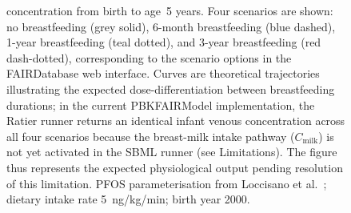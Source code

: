 \documentclass[preprint,12pt]{elsarticle}
\begin{document}
\begin{linenumbers}
\begin{figure}[htbp]
{concentration from birth to age~5 years. Four scenarios are shown: no breastfeeding
(grey solid), 6-month breastfeeding (blue dashed), 1-year breastfeeding
(teal dotted), and 3-year breastfeeding (red dash-dotted), corresponding to
the scenario options in the FAIRDatabase web interface.
Curves are theoretical trajectories illustrating the expected dose-differentiation
between breastfeeding durations; in the current PBKFAIRModel implementation,
the Ratier runner returns an identical infant venous concentration across all four
scenarios because the breast-milk intake pathway ($C_\mathrm{milk}$) is not yet
activated in the SBML runner (see Limitations). The figure thus represents the
expected physiological output pending resolution of this limitation. PFOS
parameterisation from Loccisano et al.\ \cite{loccisano2013}; dietary intake
rate 5~ng/kg/min; birth year 2000.}
\label{fig:bfscenarios}
\end{figure}


\end{linenumbers}
\end{document}
